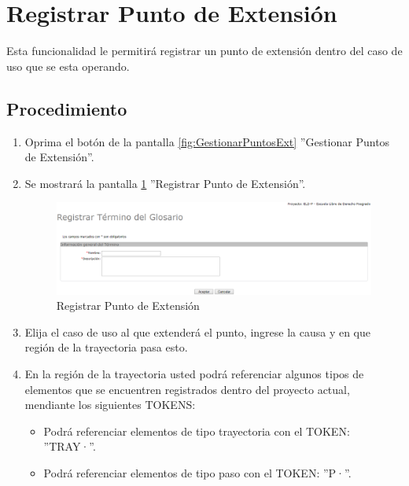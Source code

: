 
\hypertarget{cv:registrarPExt}{\section{Registrar Punto de Extensión}} \label{sec:registrarPExt}

	Esta funcionalidad le permitirá registrar un punto de extensión dentro del caso de uso que se esta operando. 

		\subsection{Procedimiento}

			\begin{enumerate}
	
			\item Oprima el botón \IURegistrar{} de la pantalla \ref{fig:GestionarPuntosExt} ''Gestionar Puntos de Extensión''.
			
			\item Se mostrará la pantalla \ref{fig:registrarPExt} ''Registrar Punto de Extensión''.

			\begin{figure}[H]
				\begin{center}
					\includegraphics[scale=0.5]{roles/lider/glosario/pantallas/IU6-1registrarTermino}
					\caption{Registrar Punto de Extensión}
					\label{fig:registrarPExt}
				\end{center}
			\end{figure}
		
			\item Elija el caso de uso al que extenderá el punto, ingrese la causa y en que región de la trayectoria pasa esto.
			
			\item En la región de la trayectoria usted podrá referenciar algunos tipos de elementos que se encuentren registrados dentro del proyecto actual, mendiante los siguientes TOKENS:
			
			\begin{itemize}
				\item Podrá referenciar elementos de tipo trayectoria con el TOKEN: ''TRAY·''.
				\item Podrá referenciar elementos de tipo paso con el TOKEN: ''P·''.
			\end{itemize}
			

\end{enumerate}
